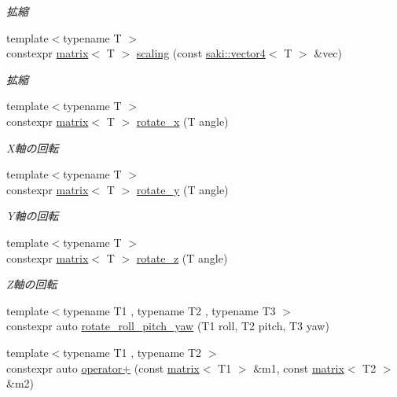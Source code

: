 \begin{DoxyCompactItemize}
\begin{DoxyCompactList}\small\item\em 拡縮 \end{DoxyCompactList}\item 
{\footnotesize template$<$typename T $>$ }\\constexpr \mbox{\hyperlink{classsaki_1_1matrix}{matrix}}$<$ T $>$ \mbox{\hyperlink{namespacesaki_aededd0f357c48d1e96af77b06cb3e786}{scaling}} (const \mbox{\hyperlink{classsaki_1_1vector4}{saki\+::vector4}}$<$ T $>$ \&vec)
\begin{DoxyCompactList}\small\item\em 拡縮 \end{DoxyCompactList}\item 
{\footnotesize template$<$typename T $>$ }\\constexpr \mbox{\hyperlink{classsaki_1_1matrix}{matrix}}$<$ T $>$ \mbox{\hyperlink{namespacesaki_a1a0f91a98432f3bbfe95892d3b547c1a}{rotate\+\_\+x}} (T angle)
\begin{DoxyCompactList}\small\item\em X軸の回転 \end{DoxyCompactList}\item 
{\footnotesize template$<$typename T $>$ }\\constexpr \mbox{\hyperlink{classsaki_1_1matrix}{matrix}}$<$ T $>$ \mbox{\hyperlink{namespacesaki_a0d794fa366b6fdf189b5b242730d020e}{rotate\+\_\+y}} (T angle)
\begin{DoxyCompactList}\small\item\em Y軸の回転 \end{DoxyCompactList}\item 
{\footnotesize template$<$typename T $>$ }\\constexpr \mbox{\hyperlink{classsaki_1_1matrix}{matrix}}$<$ T $>$ \mbox{\hyperlink{namespacesaki_a0dcbd0c8e630d947ba6f0c6e0875d552}{rotate\+\_\+z}} (T angle)
\begin{DoxyCompactList}\small\item\em Z軸の回転 \end{DoxyCompactList}\item 
{\footnotesize template$<$typename T1 , typename T2 , typename T3 $>$ }\\constexpr auto \mbox{\hyperlink{namespacesaki_a1e89f783c61c36d9885c70d966218dc0}{rotate\+\_\+roll\+\_\+pitch\+\_\+yaw}} (T1 roll, T2 pitch, T3 yaw)
\item 
{\footnotesize template$<$typename T1 , typename T2 $>$ }\\constexpr auto \mbox{\hyperlink{namespacesaki_a10eb3090250dfcb43dd1c7579b6b473c}{operator+}} (const \mbox{\hyperlink{classsaki_1_1matrix}{matrix}}$<$ T1 $>$ \&m1, const \mbox{\hyperlink{classsaki_1_1matrix}{matrix}}$<$ T2 $>$ \&m2)

\end{DoxyCompactItemize}
